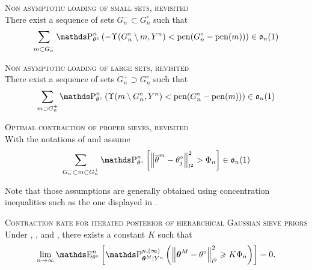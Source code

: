 \begin{as}{\textsc{Non asymptotic loading of small sets, revisited} \\}\label{AS_BAYES_STRATEGIES_EXPOLIM_SMALLSET}
There exist a sequence of sets $G^{-}_{n} \subset G^{\circ}_{n}$ such that
\[\sum\limits_{m \subset G^{-}_{n}} \P_{\theta^{\circ}}^{n}\left(- \Upsilon(G^{\circ}_{n} \setminus m, Y^{n}) < \pen(G^{\circ}_{n} - \pen(m))\right) \in \mathfrak{o}_{n}(1)\]
\end{as}

\begin{as}{\textsc{Non asymptotic loading of large sets, revisited} \\}\label{AS_BAYES_STRATEGIES_EXPOLIM_LARGESET}
There exist a sequence of sets $G^{+}_{n} \supset G^{\circ}_{n}$ such that
\[\sum\limits_{m \supset G^{+}_{n}} \P_{\theta^{\circ}}^{n}\left(\Upsilon(m \setminus G^{\circ}_{n}, Y^{n}) < \pen(G^{\circ}_{n} - \pen(m))\right) \in \mathfrak{o}_{n}(1)\]
\end{as}

\begin{as}{\textsc{Optimal contraction of proper sieves, revisited} \\}\label{AS_BAYES_STRATEGIES_EXPOLIM_OPT}
With the notations of  and  assume
\[\sum\limits_{G^{-}_{n} \subset m \subset G^{+}_{n}} \P_{\theta^{\circ}}^{n}\left[\left\Vert \overline{\theta}^{m} - \theta^{\circ}_{j} \right\Vert_{l^{2}}^{2} > \Phi_{n}\right] \in \mathfrak{o}_{n}(1)\]
\end{as}

Note that those assumptions are generally obtained using concentration inequalities such as the one displayed in .

\begin{thm}{\textsc{Contraction rate for iterated posterior of hierarchical Gaussian sieve priors} \\}\label{THM_BAYES_STRATEGIES_EXPOLIM}
Under , , and , there exists a constant $K$ such that
\[\lim\limits_{n \rightarrow \infty} \E_{\theta^{\circ}}^{n} \left[\P_{\boldsymbol{\theta}^{M} \vert Y^{n}}^{n, (\infty)}\left(\left\Vert \boldsymbol{\theta}^{M} - \theta^{\circ} \right\Vert_{l^{2}}^{2} \geq K \Phi_{n}\right)\right] = 0.\]
\end{thm}

